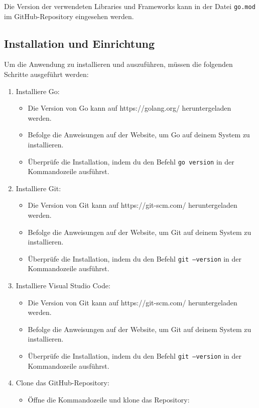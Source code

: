 Die Version der verwendeten Libraries und Frameworks kann in der Datei \texttt{go.mod} im GitHub-Repository eingesehen werden.


\subsection{Installation und Einrichtung}

Um die Anwendung zu installieren und auszuführen, müssen die folgenden Schritte ausgeführt werden:

\begin{enumerate}
    \item Installiere Go:
    \begin{itemize}
        \item Die Version von Go kann auf https://golang.org/ heruntergeladen werden.
        \item Befolge die Anweisungen auf der Website, um Go auf deinem System zu installieren.
        \item Überprüfe die Installation, indem du den Befehl \texttt{go version} in der Kommandozeile ausführst.
    \end{itemize}

    \item Installiere Git:
    \begin{itemize}
        \item Die Version von Git kann auf https://git-scm.com/ heruntergeladen werden.
        \item Befolge die Anweisungen auf der Website, um Git auf deinem System zu installieren.
        \item Überprüfe die Installation, indem du den Befehl \texttt{git --version} in der Kommandozeile ausführst.
    \end{itemize}

    \item Installiere Visual Studio Code:
    \begin{itemize}
        \item Die Version von Git kann auf https://git-scm.com/ heruntergeladen werden.
        \item Befolge die Anweisungen auf der Website, um Git auf deinem System zu installieren.
        \item Überprüfe die Installation, indem du den Befehl \texttt{git --version} in der Kommandozeile ausführst.
    \end{itemize}

    \item Clone das GitHub-Repository:
    \begin{itemize}
        \item Öffne die Kommandozeile und klone das Repository:
        

\end{itemize}
\end{enumerate}
